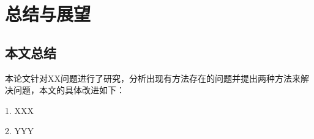 \chapter{总结与展望}
\label{chap5}


\section{本文总结}
本论文针对XX问题进行了研究，分析出现有方法存在的问题并提出两种方法来解决问题，本文的具体改进如下：

1. XXX

2. YYY